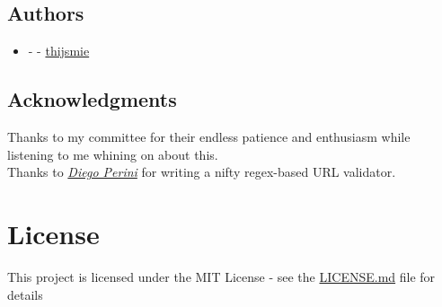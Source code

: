 \begin{page}
\subsection{Authors}

\begin{itemize}
  \item {} -  - \href{https://github.com/thijsmie}{thijsmie}
\end{itemize}

\subsection{Acknowledgments}

Thanks to my committee for their endless patience and enthusiasm while listening to me whining on about this.
\\
Thanks to \href{http://www.iport.it}{\textit{Diego Perini}} for writing a nifty regex-based URL validator.

\section{License}

This project is licensed under the MIT License - see the \href{LICENSE.md}{LICENSE.md} file for details



\end{page}